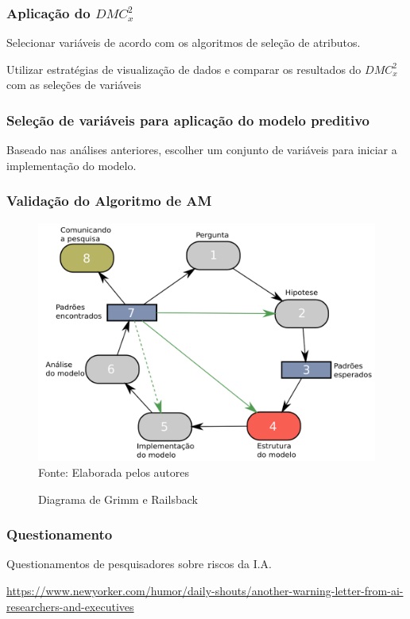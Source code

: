 \documentclass[11pt, aspectratio=169]{beamer}
\newcommand{\dmc}{\(DMC_x^2\) }
\begin{document}
\begin{frame}
  \frametitle{Aplicação do \dmc}

  Selecionar variáveis de acordo com os algoritmos de seleção de atributos.

  Utilizar estratégias de visualização de dados e comparar os resultados do \dmc com as seleções de variáveis


\end{frame}

\begin{frame}
  \frametitle{Seleção de variáveis para aplicação do modelo preditivo}

  Baseado nas análises anteriores, escolher um conjunto de variáveis para iniciar a implementação do modelo.

\end{frame}


\begin{frame}
  \frametitle{Validação do Algoritmo de AM}

  \begin{figure}[!htb]
    \centering
    \caption{Diagrama de Grimm e Railsback}
    \includegraphics[height=.6\paperheight]{../Figures/intro/Ciclo_Grimm.png}
    \\{\footnotesize Fonte: Elaborada pelos autores}
    \label{fig:fluxoGrimm}
  \end{figure}



\end{frame}

\begin{frame}
  \frametitle{Questionamento}
  \begin{center}


    \Huge{Questionamentos de pesquisadores sobre riscos da I.A.}

  \end{center}
  \leavevmode\hphantom{ }
  \begin{center}
    \small{\url{https://www.newyorker.com/humor/daily-shouts/another-warning-letter-from-ai-researchers-and-executives}}
  \end{center}

\end{frame}
\end{document}
